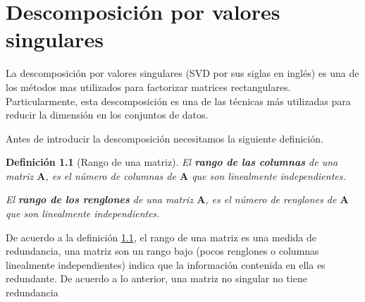 \documentclass[11pt]{report}
\theoremstyle{break}
\newtheorem{definicion}{Definición}[chapter]
\theoremstyle{break}
\begin{document}
\chapter{Descomposición por valores singulares}
\label{capitulo:SVD}
La descomposición por valores singulares (SVD por sus siglas en inglés) es una de los métodos mas utilizados para factorizar matrices rectangulares. Particularmente, esta descomposición es una de las técnicas más utilizadas para reducir la dimensión en los conjuntos de datos.

Antes de introducir la descomposición necesitamos la siguiente definición.

\begin{definicion}[Rango de una matriz]
\label{definicion:rango de una matriz}
El \textbf{rango de las columnas} de una matriz $\bm{A}$, es el número de columnas de $\bm{A}$ que son linealmente independientes.

El \textbf{rango de los renglones} de una matriz $\bm{A}$, es el número de renglones de $\bm{A}$ que son linealmente independientes.
\end{definicion}

De acuerdo a la definición \ref{definicion:rango de una matriz}, el rango de una matriz es una medida de redundancia, una matriz son un rango bajo (pocos renglones o columnas linealmente independientes) indica que la información contenida en ella es redundante. De acuerdo a lo anterior, una matriz no singular no tiene redundancia
\end{document}
